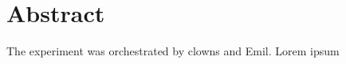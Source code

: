 \maketitle
%
\clearpage
\chapter{Abstract}
The experiment was orchestrated by clowns and Emil.
Lorem ipsum